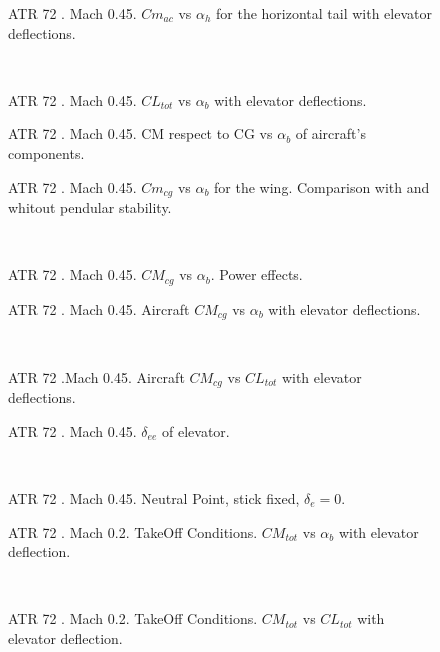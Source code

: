 \begin{figure}[H]
\centering

\caption{ATR 72 . Mach 0.45. $Cm_{ac}$ vs $\alpha_h$ for the horizontal tail with elevator deflections.}
\label{fig:stallATR}
\end{figure}
\noindent\\
\begin{figure}[H]
\centering

\caption{ATR 72 . Mach 0.45. $CL_{tot}$ vs $\alpha_b$ with elevator deflections.}
\label{fig:stallATR}
\end{figure}
\begin{figure}[H]
\centering

\caption{ATR 72 . Mach 0.45. CM respect to CG vs $\alpha_b$ of aircraft's components.}
\label{fig:stallATR}
\end{figure}
\begin{figure}[H]
\centering

\caption{ATR 72 . Mach 0.45. $Cm_{cg}$ vs $\alpha_b$ for the wing. Comparison with and whitout pendular stability.}
\label{fig:stallATR}
\end{figure}
\noindent\\
\begin{figure}[H]
\centering

\caption{ATR 72 . Mach 0.45. $CM_{cg}$ vs $\alpha_b$. Power effects.}
\label{fig:stallATR}
\end{figure}
\begin{figure}[H]
\centering

\caption{ATR 72 . Mach 0.45. Aircraft $CM_{cg}$ vs $\alpha_b$ with elevator deflections.}
\label{fig:stallATR}
\end{figure}
\noindent\\
\begin{figure}[H]
\centering

\caption{ATR 72 .Mach 0.45. Aircraft $CM_{cg}$ vs $CL_{tot}$ with elevator deflections.}
\label{fig:stallATR}
\end{figure}
\begin{figure}[H]
\centering

\caption{ATR 72 . Mach 0.45. $\delta_{ee}$ of elevator.}
\label{fig:stallATR}
\end{figure}
\noindent\\
\begin{figure}[H]
\centering

\caption{ATR 72 . Mach 0.45. Neutral Point, stick fixed, $\delta_e = 0 $.}
\label{fig:stallATR}
\end{figure}
\begin{figure}[H]
\centering

\caption{ATR 72 . Mach 0.2. TakeOff Conditions. $CM_{tot}$ vs $\alpha_b$ with elevator deflection.}
\label{fig:stallATR}
\end{figure}
\noindent\\
\begin{figure}[H]
\centering

\caption{ATR 72 . Mach 0.2. TakeOff Conditions. $CM_{tot}$ vs $CL_{tot}$ with elevator deflection.}
\label{fig:stallATR}
\end{figure}

